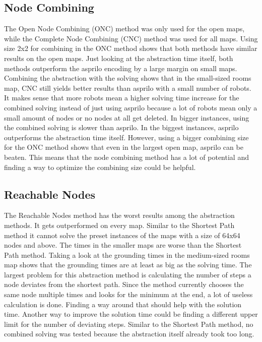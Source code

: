 \documentclass[runningheads]{llncs}
\begin{document}
\subsection{Node Combining}
The Open Node Combining (ONC) method was only used for the open maps, while the Complete Node Combining (CNC) method was used for all maps. Using size 2x2 for combining in the ONC method shows that both methods have similar results on the open maps. Just looking at the abstraction time itself, both methods outperform the asprilo encoding by a large margin on small maps. Combining the abstraction with the solving shows that in the small-sized rooms map, CNC still yields better results than asprilo with a small number of robots. It makes sense that more robots mean a higher solving time increase for the combined solving instead of just using asprilo because a lot of robots mean only a small amount of nodes or no nodes at all get deleted. In bigger instances, using the combined solving is slower than asprilo. In the biggest instances, asprilo outperforms the abstraction time itself. However, using a bigger combining size for the ONC method shows that even in the largest open map, asprilo can be beaten. This means that the node combining method has a lot of potential and finding a way to optimize the combining size could be helpful. 
\subsection{Reachable Nodes}
The Reachable Nodes method has the worst results among the abstraction methods. It gets outperformed on every map. Similar to the Shortest Path method it cannot solve the preset instances of the maps with a size of 64x64 nodes and above. The times in the smaller maps are worse than the Shortest Path method. Taking a look at the grounding times in the medium-sized rooms map shows that the grounding times are at least as big as the solving time. The largest problem for this abstraction method is calculating the number of steps a node deviates from the shortest path. Since the method currently chooses the same node multiple times and looks for the minimum at the end, a lot of useless calculation is done. Finding a way around that should help with the solution time. Another way to improve the solution time could be finding a different upper limit for the number of deviating steps. Similar to the Shortest Path method, no combined solving was tested because the abstraction itself already took too long.
\end{document}
